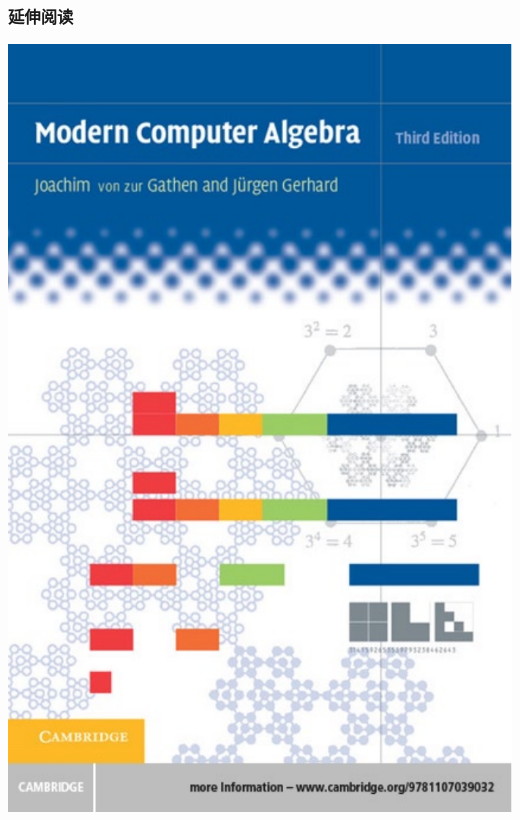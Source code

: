 \documentclass{ctexbeamer}
\begin{document}
\begin{frame}
  \frametitle{延伸阅读}

  \includegraphics[scale=0.3]{GG.pdf}

\end{frame}
\end{document}
